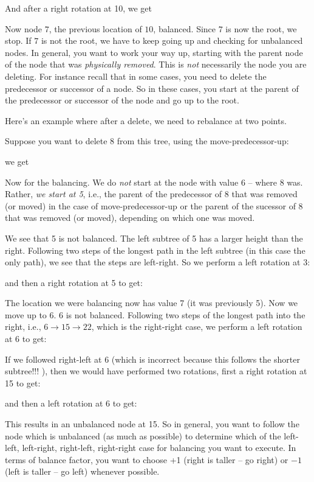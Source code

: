 

And after a right rotation at 10, we get




Now node $7$, the previous location of $10$, balanced.
Since $7$ is now the root, we stop.
If $7$ is not the root, we have to keep going up and checking for
unbalanced nodes.
In general, you want to work your way up, starting with the
parent node of the node that was \textit{physically removed}.
This is \textit{not} necessarily the node you are deleting.
For instance recall that in some cases,
you need to delete the predecessor or successor of a node.
So in these cases, you start at the parent of the predecessor or successor
of the node and go up to the root.

Here's an example where after a delete, we need to rebalance at
two points.

Suppose you want to delete 8 from this tree,
using the move-predecessor-up:

we get

Now for the balancing.
We do \textit{not} start at the node with value 6 -- where 8 was.
Rather, \textit{we start at 5}, i.e., the parent of the predecessor of 8
that was removed (or moved)
in the case of move-predecessor-up
or the parent of the sucessor of 8
that was removed (or moved), depending on which one was moved.

We see that 5 is not balanced.
The left subtree of 5 has a larger height than the right.
Following two steps of the longest path in the left subtree
(in this case the only path), we see that the steps are left-right.
So we perform a left rotation at 3:

and then a right rotation at 5 to get:

The location we were balancing now has value 7 (it was previously 5).
Now we move up to 6.
6 is not balanced.
Following two steps of the longest path into the right, i.e.,
$6 \rightarrow 15 \rightarrow 22$, which is the right-right case,
we perform a left rotation at 6 to get:

If we followed right-left at 6 (which is incorrect because this
follows the shorter subtree!!! ),
then we would have performed
two rotations, first a right rotation at 15 to get:

and then a left rotation at 6 to get:

This results in an unbalanced node at 15.
So in general, you want to follow the node which is unbalanced (as much as possible)
to determine which of the left-left, left-right, right-left, right-right
case for balancing you want to execute.
In terms of balance factor, you want to choose +1 (right is taller -- go right)
or $-1$ (left is taller -- go left) whenever possible.

